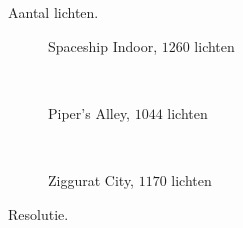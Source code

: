 \begin{figure}[t]
\begin{minipage}[t]{0.5\textwidth}
  \caption{\small Aantal lichten.}
  \label{fig:fds-test-lights}
  \end{minipage} %
  \begin{minipage}[t]{0.5\textwidth}
  \begin{adjustbox}{minipage=\textwidth, scale=0.55}
    \begin{subfigure}[b]{1.6\textwidth}
      \centering
      \def\svgwidth{\textwidth}
      
      \caption{Spaceship Indoor, $1260$ lichten}
      \vspace{4pt}
      \label{fig:fds-test-resolution:indoor}
    \end{subfigure}
  \end{adjustbox} \\
  \begin{adjustbox}{minipage=\textwidth, scale=0.55}
    \begin{subfigure}[b]{1.6\textwidth}
      \centering
      \def\svgwidth{\textwidth}
      
      \caption{Piper's Alley, $1044$ lichten}
      \vspace{4pt}
      \label{fig:fds-test-resolution:alley}
    \end{subfigure}
  \end{adjustbox} \\
  \begin{adjustbox}{minipage=\textwidth, scale=0.55}
    \begin{subfigure}[b]{1.6\textwidth}
      \centering
      \def\svgwidth{\textwidth}
      
      \caption{Ziggurat City, $1170$ lichten}
      \label{fig:fds-test-resolution:city}
    \end{subfigure}
  \end{adjustbox}
  \caption{\small Resolutie. }
  \label{fig:fds-test-resolution}
  \end{minipage}
\end{figure}

